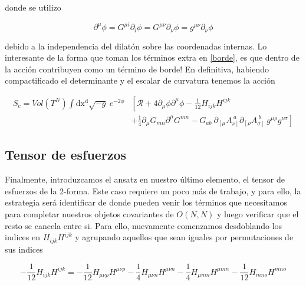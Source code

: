 \documentclass{article}
\numberwithin{equation}{section}
\begin{document}
donde se utilizo 

\begin{equation}
\partial^{\mu} \phi = G^{\mu i} \partial_i \phi = G^{\mu \nu} \partial_{\nu} \phi = g^{\mu \nu} \partial_{\nu} \phi
\end{equation}

debido a la independencia del dilatón sobre las coordenadas internas. Lo interesante de la forma que toman los términos extra en \ref{borde}, es que dentro de la acción contribuyen como un término de borde! En definitiva, habiendo compactificado el determinante y el escalar de curvatura tenemos la acción

\begin{boxquation}
	\begin{equation}\label{S_ricci}
	\begin{aligned}
	S_c =Vol \left(T^N\right) \int\mathrm{dx^d} \sqrt{-g} \ e^{-2\phi}&\left[\mathcal{R} + 4 \partial_{\mu}\phi\partial^{\mu} \phi   - \frac{1}{12} H_{i j k}H^{i j k} \right.\\
	& \left. + \frac{1}{4} \partial_{\mu}{G_{m n}}\partial^{\mu} G^{m n} - G_{a b} \ \partial_{\left[\mu\right.} A_{\left.\nu\right]}^{\ a} \partial_{\left[\rho\right.} A_{\left.\sigma\right]}^{\ b} \ g^{\mu \rho} g^{\nu \sigma}\right]
	\end{aligned}
	\end{equation}
\end{boxquation}

\subsection{Tensor de esfuerzos}

Finalmente, introduzcamos el ansatz en nuestro último elemento, el tensor de esfuerzos de la 2-forma. Este caso requiere un poco más de trabajo, y para ello, la estrategia será identificar de donde pueden venir los términos que necesitamos para completar nuestros objetos covariantes de $ O(N,N) $ y luego verificar que el resto se cancela entre si. Para ello, nuevamente comenzamos desdoblando los indices en $ H_{i j k} H^{i j k} $ y agrupando aquellos que sean iguales por permutaciones de sus indices

\begin{equation}\label{H1}
- \frac{1}{12} H_{i j k} H^{i j k} = - \frac{1}{12} H_{\mu \nu \rho} H^{\mu \nu \rho} - \frac{1}{4} H_{\mu \nu n} H^{\mu \nu n} - \frac{1}{4} H_{\mu m n} H^{\mu m n} - \frac{1}{12} H_{m n o} H^{m n o}
\end{equation}
\end{document}
